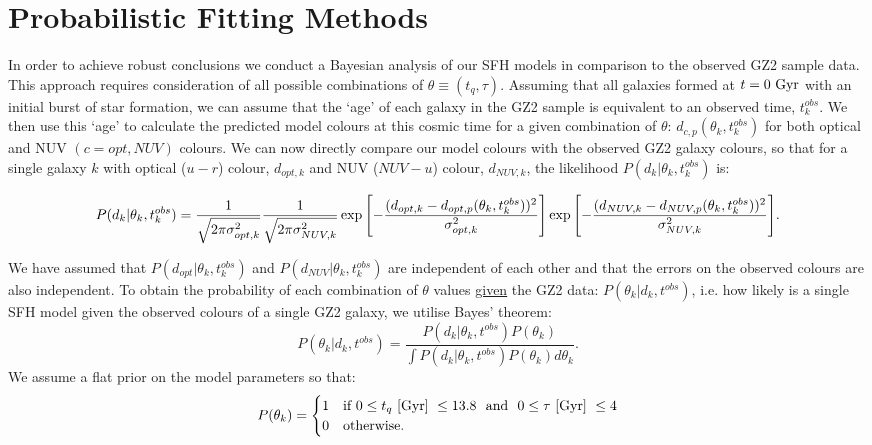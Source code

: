 \section{Probabilistic Fitting Methods}

In order to achieve robust conclusions we conduct a Bayesian analysis \citep{Sivia, mackay03} of our SFH models in comparison to the observed GZ2 sample data. This approach requires consideration of all possible combinations of $\theta \equiv (t_{q}, \tau)$. Assuming that all galaxies formed at $t=0~\rm{Gyr}$ with an initial burst of star formation, we can assume that the `age' of each galaxy in the GZ2 sample is equivalent to an observed time, $t^{obs}_{k}$. We then use this  `age' to calculate the predicted model colours at this cosmic time for a given combination of $\theta$: $d_{c,p}(\theta_k, t^{obs}_{k})$ for both optical and NUV $(c={opt,NUV})$ colours. We can now directly compare our model colours with the observed GZ2 galaxy colours, so that for a single galaxy $k$ with optical ($u-r$) colour, $d_{opt, k}$ and NUV ($NUV-u$) colour, $d_{NUV,k}$, the likelihood $P(d_{k}|\theta_k, t^{obs}_{k})$ is:


\begin{equation}\label{like}
P(d_{k}|\theta_k, t^{obs}_{k}) = \frac{1}{\sqrt{2\pi\sigma_{opt, k}^2}}\frac{1}{\sqrt{2\pi\sigma_{NUV, k}^2}} \\ \exp{\left[ - \frac{(d_{opt, k} - d_{opt, p}(\theta_k, t_{k}^{obs}))^2}{\sigma_{opt, k}^2} \right]} \\ \exp{\left[ - \frac{(d_{NUV, k} - d_{NUV, p}(\theta_k, t_{k}^{obs}))^2}{\sigma_{NUV, k}^2} \right]}.
\end{equation}


We have assumed that $P(d_{opt}|\theta_k, t^{obs}_{k})$ and $P(d_{NUV}|\theta_k, t^{obs}_{k})$ are independent of each other and that the errors on the observed colours are also independent. To obtain the probability of each combination of $\theta$ values \underline{given} the GZ2 data: $P(\theta_k|d_k, t^{obs})$, i.e. how likely is a single SFH model given the observed colours of a single GZ2 galaxy, we utilise Bayes' theorem:
 \begin{equation}\label{big}
P(\theta_k|d_k, t^{obs}) = \frac{P(d_k|\theta_k, t^{obs})P(\theta_k)}{\int P(d_k |\theta_k, t^{obs})P(\theta_k) d\theta_k}.
\end{equation}
We assume a flat prior on the model parameters so that:
\begin{equation}\label{prior}
P(\theta_k) =
\begin{cases}
1 & \text{if } 0 \leq t_q ~\rm{[Gyr]}~ \leq 13.8 ~  \text{ and } ~ 0 \leq \tau  ~\rm{[Gyr]}~ \leq 4\\
0 & \text{otherwise.} \\
\end{cases}
\end{equation}

